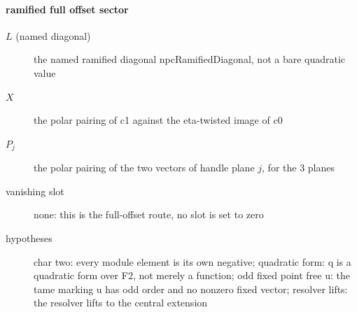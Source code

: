 \paragraph{ramified full offset sector}
\begin{description}
\item[$L$ (named diagonal)] the named ramified diagonal npcRamifiedDiagonal, not a bare quadratic value
\item[$X$] the polar pairing of c1 against the eta-twisted image of c0
\item[$P_j$] the polar pairing of the two vectors of handle plane $j$, for the 3 planes
\item[vanishing slot] none: this is the full-offset route, no slot is set to zero
\item[hypotheses] char two: every module element is its own negative; quadratic form: q is a quadratic form over F2, not merely a function; odd fixed point free u: the tame marking u has odd order and no nonzero fixed vector; resolver lifts: the resolver lifts to the central extension
\end{description}
